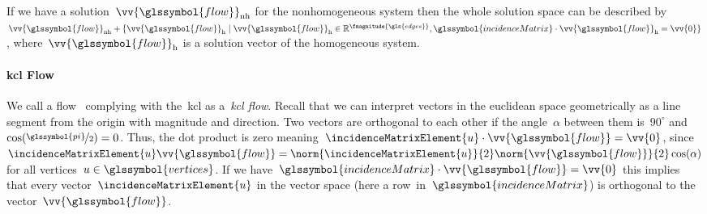 % 
If we have a solution~$\vv{\glssymbol{flow}}_{\mathrm{nh}}$ for the
nonhomogeneous system then the whole solution space can be described
by~$
    \vv{\glssymbol{flow}}_{\mathrm{nh}} 
    +  
    \{ 
        \vv{\glssymbol{flow}}_{\mathrm{h}}
    \mid
        \vv{\glssymbol{flow}}_{\mathrm{h}}
        \in
        \reals^{\fmagnitude{\gls{edges}}},
        \glssymbol{incidenceMatrix}
        \cdot
        \vv{\glssymbol{flow}}_{\mathrm{h}}
        =
        \vv{0}
    \}
$,
where~$\vv{\glssymbol{flow}}_{\mathrm{h}}$ is a solution vector of the
homogeneous system.
%
\paragraph{\gls{kcl} Flow}
\label{ch:network-analyzes:sec:mathematical-model:paragraph:kcl-flow}
% 
We call a flow~ complying with the~\gls{kcl} as
a~\emph{\gls{kcl} flow}. Recall that we can interpret vectors in the euclidean
space geometrically as a line segment from the origin with magnitude and
direction. Two vectors are orthogonal to each other if the angle~$\alpha$
between them is~$90^\circ$ and~$\cos (\nicefrac{\glssymbol{pi}}{2}) = 0$. Thus,
the dot product is zero meaning~$
    \incidenceMatrixElement{\vertexa}
    \cdot
    \vv{\glssymbol{flow}} 
    = 
    \vv{0}
$, since~$
    \incidenceMatrixElement{\vertexa}
    \vv{\glssymbol{flow}} 
    =
    \norm{
        \incidenceMatrixElement{\vertexa}
    }{2}
    \norm{
        \vv{\glssymbol{flow}}
    }{2}
    \cos(\alpha)
$ for all vertices~$\vertexa\in\glssymbol{vertices}$. If we have~$
    \glssymbol{incidenceMatrix}
    \cdot
    \vv{\glssymbol{flow}} 
    = 
    \vv{0}
$ this implies that every vector~$\incidenceMatrixElement{\vertexa}$ in the
vector space (here a row~\vertexa in~$\glssymbol{incidenceMatrix}$) is
orthogonal to the vector~$\vv{\glssymbol{flow}}$.
% 
